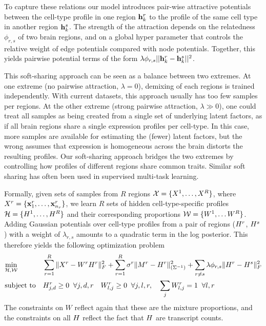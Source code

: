 \documentclass{article} %
\newcommand{\W}{W}
\begin{document}
To capture these relations our model introduces pair-wise attractive potentials between the cell-type profile in one region $\mathbf{h}^r_k$ to the profile of the same cell type in another region $\mathbf{h}^s_k$. The strength of the attraction depends on the relatedness $\phi_{r,s}$ of two brain regions, and on a global hyper parameter that controls the relative weight of edge potentials compared with node potentials. Together, this yields pairwise potential terms of the form 
$\lambda \phi_{r,s}|| \mathbf{h}^r_k - \mathbf{h}^s_k||^2$.

This soft-sharing approach can be seen as a balance between two extremes. At one extreme (no pairwise attraction, $\lambda=0$), demixing of each regions is trained independently. With current datasets, this approach usually has too few samples per regions.  At the other extreme (strong pairwise attraction, $\lambda \gg 0$), one could treat all samples as being created from a single set of underlying latent factors, as if all brain regions share a single expression profiles per cell-type. In this case, more samples are available for estimating the (fewer) latent factors, but the wrong assumes that expression is homogeneous across the brain   distorts the resulting profiles. Our soft-sharing approach bridges the two extremes by controlling how profiles of different regions share common traits. Similar soft sharing has often been used in supervised multi-task learning. 

Formally, given sets of samples from $R$ regions ${\cal{X}} = \{X^1,\ldots, X^R\}$, where $X^r = \{\mathbf{x}^r_1, \ldots, \mathbf{x}^r_{n_r} \}$, we learn $R$ sets of hidden cell-type-specific profiles ${\cal{{H}}} = \{{H}^1,\ldots, {H}^R\}$ and their corresponding proportions ${\cal{W}} = \{ W^1,\ldots W^R\}$. Adding Gaussian potentials over cell-type profiles from a pair of regions (${H}^r$, ${H}^s$) with a weight of $\lambda_{r,s}$ amounts to a quadratic term in the log posterior. This therefore yields the following optimization problem
\begin{equation}
    \label{eq-multi}
    \begin{aligned}
        & \underset{\cal{{H}},\cal{W}}{\text{min}}  
        & & \sum_{r=1}^R  \| X^r - W^r {H}^r \|_F^2
        + \sum_{r=1}^R  \sigma^r \| M^r - {H}^r \|^2_{(\Sigma^{-1})}  
        + \sum_{r \neq s} \lambda \phi_{r , s} \| {H}^r - {H}^s \|_F^2  \\
        & \text{subject to} &
            & H^r_{j,d} \geq 0 \;\;\forall j, d, r \quad W^r_{l,j} \geq 0 \;\; \forall j, l, r , \quad \sum_j W^r_{l,j} = 1 \;\; \forall l,r \\
    \end{aligned}
\end{equation}
The constraints on $\W$ reflect again that these are the mixture proportions, and the constraints on all ${H}$ reflect the fact that ${H}$ are transcript counts.
\end{document}
